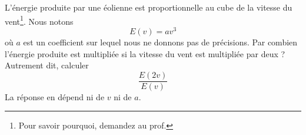 
\begin{exercice}\label{exoSeconde-0068}

    L'énergie produite par une éolienne est proportionnelle au cube de la vitesse du vent\footnote{Pour savoir pourquoi, demandez au prof.}. Nous notons
    \begin{equation}
        E(v)=av^3
    \end{equation}
    où \( a\) est un coefficient sur lequel nous ne donnons pas de précisions. Par combien l'énergie produite est multipliée si la vitesse du vent est multipliée par deux ? Autrement dit, calculer
    \begin{equation}
        \frac{ E(2v) }{ E(v) }
    \end{equation}
    La réponse en dépend ni de \( v\) ni de \( a\).

\end{exercice}
